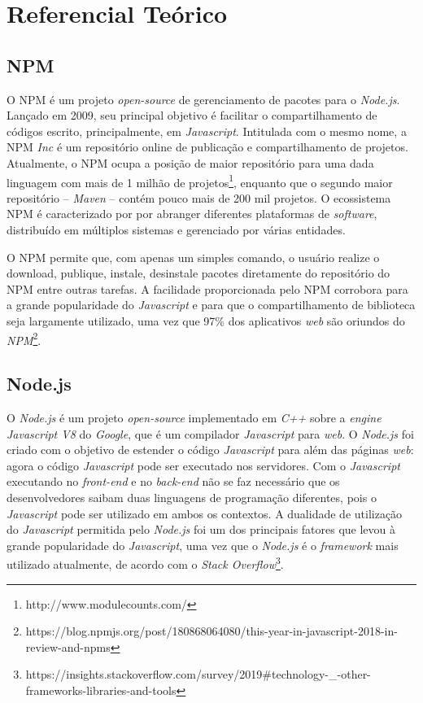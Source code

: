 \chapter{Referencial Teórico}
\label{cap:ref-teorico}

\section{\gls{NPM}}
\label{ref-teo:npm}
O \gls{NPM} é um projeto \textit{open-source} de gerenciamento de pacotes para o \textit{Node.js}. Lançado em 2009, seu principal objetivo é facilitar o compartilhamento de códigos escrito, principalmente, em \textit{Javascript}. Intitulada com o mesmo nome, a \gls{NPM} \textit{Inc} é um repositório online de publicação e compartilhamento de projetos. Atualmente, o \gls{NPM} ocupa a posição de maior repositório para uma dada linguagem com mais de 1 milhão de projetos\footnote{http://www.modulecounts.com/}, enquanto que o segundo maior repositório -- \textit{Maven} -- contém pouco mais de 200 mil  projetos. O ecossistema \gls{NPM} é caracterizado por  por abranger diferentes plataformas de \textit{software}, distribuído em múltiplos sistemas e gerenciado por várias entidades.

O \gls{NPM} permite que, com apenas um simples comando, o usuário realize o download, publique, instale, desinstale pacotes diretamente do repositório do \gls{NPM} entre outras tarefas. A facilidade proporcionada pelo \gls{NPM} corrobora para a grande popularidade do \textit{Javascript} e para que o compartilhamento de biblioteca seja largamente utilizado, uma vez que 97\% dos aplicativos \textit{web} são oriundos do \textit{NPM}\footnote{https://blog.npmjs.org/post/180868064080/this-year-in-javascript-2018-in-review-and-npms}.

\section{Node.js}
\label{ref-teo:node}
O \textit{Node.js} é um projeto \textit{open-source} implementado em \textit{C++} sobre a \textit{engine Javascript V8} do \textit{Google}, que é um compilador \textit{Javascript} para \textit{web}. O \textit{Node.js} foi criado com o objetivo de estender o código \textit{Javascript} para além das páginas \textit{web}: agora o código \textit{Javascript} pode ser executado nos servidores. Com o \textit{Javascript} executando no \textit{front-end} e no \textit{back-end} não se faz necessário que os desenvolvedores saibam duas linguagens de programação diferentes, pois o \textit{Javascript} pode ser utilizado em ambos os contextos. A dualidade de utilização do \textit{Javascript} permitida pelo \textit{Node.js} foi um dos principais fatores que levou à grande popularidade do \textit{Javascript}, uma vez que o \textit{Node.js} é o \textit{framework} mais utilizado atualmente, de acordo com o \textit{Stack Overflow}\footnote{https://insights.stackoverflow.com/survey/2019\#technology-_-other-frameworks-libraries-and-tools}.

